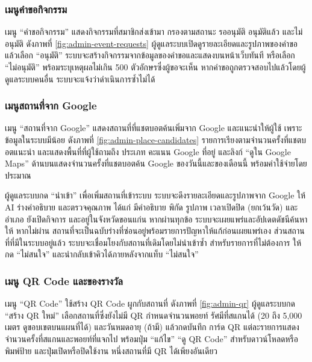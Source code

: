 
\subsubsection{เมนูคำขอกิจกรรม}

เมนู ``คำขอกิจกรรม'' แสดงกิจกรรมที่สมาชิกส่งเข้ามา กรองตามสถานะ รออนุมัติ อนุมัติแล้ว และไม่อนุมัติ ดังภาพที่ \ref{fig:admin-event-requests} ผู้ดูแลระบบเปิดดูรายละเอียดและรูปภาพของคำขอ แล้วเลือก ``อนุมัติ'' ระบบจะสร้างกิจกรรมจากข้อมูลของคำขอและแสดงบนหน้าเว็บทันที หรือเลือก ``ไม่อนุมัติ'' พร้อมระบุเหตุผลไม่เกิน 500 ตัวอักษรซึ่งผู้ขอจะเห็น หากคำขอถูกตรวจสอบไปแล้วโดยผู้ดูแลระบบคนอื่น ระบบจะแจ้งว่าดำเนินการซ้ำไม่ได้


\subsubsection{เมนูสถานที่จาก Google}

เมนู ``สถานที่จาก Google'' แสดงสถานที่ที่แชตบอตค้นเพิ่มจาก Google และแนะนำให้ผู้ใช้ เพราะข้อมูลในระบบมีน้อย ดังภาพที่ \ref{fig:admin-place-candidates} รายการเรียงตามจำนวนครั้งที่แชตบอตแนะนำ และแสดงพื้นที่ที่ผู้ใช้ถามถึง ประเภท คะแนน Google ที่อยู่ และลิงก์ ``ดูใน Google Maps'' ด้านบนแสดงจำนวนครั้งที่แชตบอตค้น Google ของวันนี้และของเดือนนี้ พร้อมค่าใช้จ่ายโดยประมาณ


ผู้ดูแลระบบกด ``นำเข้า'' เพื่อเพิ่มสถานที่เข้าระบบ ระบบจะดึงรายละเอียดและรูปภาพจาก Google ให้ AI ร่างคำอธิบาย และตรวจคุณภาพ ได้แก่ มีคำอธิบาย พิกัด รูปภาพ เวลาเปิดปิด (ยกเว้นวัด) และอำเภอ ยังเปิดกิจการ และอยู่ในจังหวัดขอนแก่น หากผ่านทุกข้อ ระบบจะเผยแพร่และอัปเดตดัชนีค้นหาให้ หากไม่ผ่าน สถานที่จะเป็นฉบับร่างที่ซ่อนอยู่พร้อมรายการปัญหาให้แก้ก่อนเผยแพร่เอง ส่วนสถานที่ที่มีในระบบอยู่แล้ว ระบบจะเชื่อมโยงกับสถานที่เดิมโดยไม่นำเข้าซ้ำ สำหรับรายการที่ไม่ต้องการ ให้กด ``ไม่สนใจ'' และนำกลับเข้าคิวได้ภายหลังจากแท็บ ``ไม่สนใจ''

\subsubsection{เมนู QR Code และของรางวัล}

เมนู ``QR Code'' ใช้สร้าง QR Code ผูกกับสถานที่ ดังภาพที่ \ref{fig:admin-qr} ผู้ดูแลระบบกด ``สร้าง QR ใหม่'' เลือกสถานที่ซึ่งยังไม่มี QR กำหนดจำนวนพอยท์ รัศมีที่สแกนได้ (20 ถึง 5,000 เมตร ดูขอบเขตบนแผนที่ได้) และวันหมดอายุ (ถ้ามี) แล้วกดบันทึก การ์ด QR แต่ละรายการแสดงจำนวนครั้งที่สแกนและพอยท์ที่แจกไป พร้อมปุ่ม ``แก้ไข'' ``ดู QR Code'' สำหรับดาวน์โหลดหรือพิมพ์ป้าย และปุ่มเปิดหรือปิดใช้งาน หนึ่งสถานที่มี QR ได้เพียงอันเดียว

